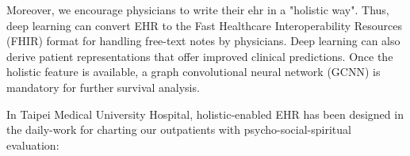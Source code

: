 \documentclass[12pt, a4paper]{article}
\begin{document}
Moreover, we encourage physicians to write their \acrshort{ehr} in a "holistic way".
Thus, deep learning can convert EHR to the Fast Healthcare Interoperability Resources (FHIR) format\citep{Rajkomar2018}\citep{HealthLevelSeven2019} for handling free-text notes by physicians.
Deep learning can also derive patient representations that offer improved clinical predictions\citep{Miotto2016}.
Once the holistic feature is available, a graph convolutional neural network (GCNN) is mandatory for further survival analysis\citep{Ching2018a}.

In Taipei Medical University Hospital, holistic-enabled EHR has been designed in the daily-work for charting our outpatients with psycho-social-spiritual evaluation\citep{Ling-ChengMong2021}:\\
\end{document}
